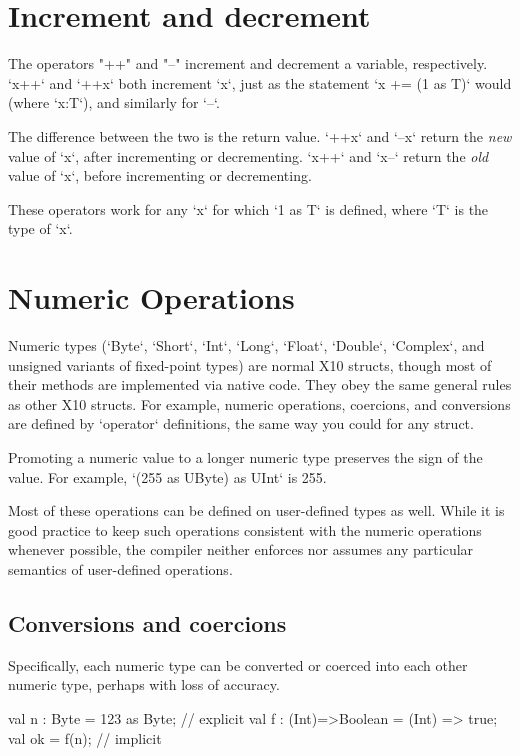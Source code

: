 \section{Increment and decrement}
\index{\Xcd{++}}
\index{\Xcd{--}}


The operators \xcd"++" and \xcd"--" increment and decrement
a variable, respectively.  
\xcd`x++` and \xcd`++x` both increment \xcd`x`, just as the statement 
\xcd`x += (1 as T)` would (where \xcd`x:T`), and similarly for \xcd`--`.  

The difference between the two is the return value.  
\xcd`++x` and \xcd`--x` return the {\em new} value of \xcd`x`, after
incrementing or decrementing.
\xcd`x++` and \xcd`x--` return the {\em old} value of \xcd`x`, before
incrementing or decrementing.

These operators work for any \xcd`x` for which \xcd`1 as T` is defined, where
\xcd`T` is the type of \xcd`x`.  


\section{Numeric Operations}
\label{XtenPromotions}

Numeric types (\xcd`Byte`, \xcd`Short`, \xcd`Int`, \xcd`Long`, \xcd`Float`,
\xcd`Double`, \xcd`Complex`, and unsigned variants of fixed-point types) are normal X10
structs, though most of their methods are implemented via native code. They
obey the same general rules as other X10 structs. For example, numeric
operations, coercions, and conversions are defined by \xcd`operator` definitions, the same way you could
for any struct.

Promoting a numeric value to a longer numeric type preserves the sign of the
value.  For example, \xcd`(255 as UByte) as UInt` is 255. 

Most of these operations can be defined on user-defined types as well.  While
it is good practice to keep such operations consistent with the numeric
operations whenever possible, the compiler neither enforces nor assumes any
particular semantics of user-defined operations. 

\subsection{Conversions and coercions}

Specifically, each numeric type can be converted or coerced into each other
numeric type, perhaps with loss of accuracy.
\begin{ex}
\begin{xten}
val n : Byte = 123 as Byte; // explicit 
val f : (Int)=>Boolean = (Int) => true; 
val ok = f(n); // implicit
\end{xten}
\end{ex}


